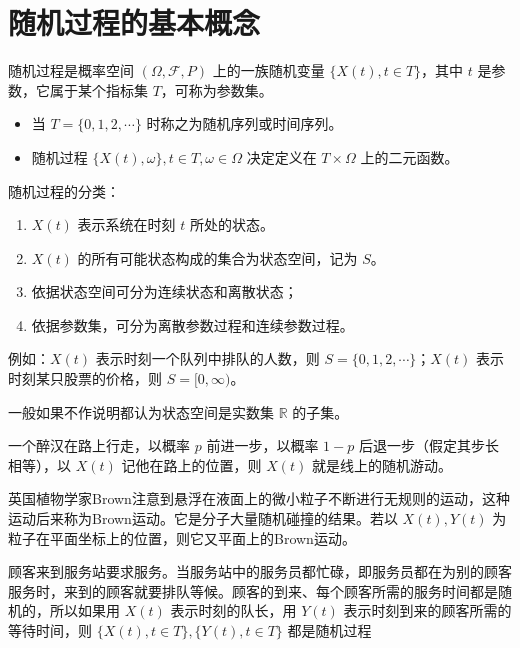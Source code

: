 \documentclass[lang=cn,10pt,thmcnt=section]{elegantbook}
\begin{document}
\section{随机过程的基本概念}
\begin{definition}
	随机过程是概率空间 $(\Omega, \mathcal{F}, P)$ 上的一族随机变量 $\{X(t), t \in T\}$，其中 $t$ 是参数，它属于某个指标集 $T$，可称为参数集。
\end{definition}
\begin{remark}
	\begin{itemize}
		\item 当 $T = \{0, 1, 2, \cdots\}$ 时称之为随机序列或时间序列。
		\item 随机过程 $\{X(t), \omega\}, t \in T, \omega \in \Omega$ 决定定义在 $T \times \Omega$ 上的二元函数。
	\end{itemize}
	
\end{remark}
随机过程的分类：
	\begin{enumerate}
		\item $X(t)$ 表示系统在时刻 $t$ 所处的状态。
		\item $X(t)$ 的所有可能状态构成的集合为状态空间，记为 $S$。
		\item 依据状态空间可分为连续状态和离散状态；
		\item 依据参数集，可分为离散参数过程和连续参数过程。
	\end{enumerate}
	例如：$X(t)$ 表示时刻一个队列中排队的人数，则 $S = \{0, 1, 2, \cdots\}$；$X(t)$ 表示时刻某只股票的价格，则 $S = [0, \infty)$。
	
\begin{remark}
	一般如果不作说明都认为状态空间是实数集 $\mathbb{R}$ 的子集。

\end{remark}
\begin{example}[随机游动]
	一个醉汉在路上行走，以概率 $p$ 前进一步，以概率 $1-p$ 后退一步（假定其步长相等），以 $X(t)$ 记他在路上的位置，则 $X(t)$ 就是线上的随机游动。

\end{example}
\begin{example}[Brown运动]
	英国植物学家Brown注意到悬浮在液面上的微小粒子不断进行无规则的运动，这种运动后来称为Brown运动。它是分子大量随机碰撞的结果。若以 $X(t), Y(t)$ 为粒子在平面坐标上的位置，则它又平面上的Brown运动。
\end{example}
\begin{example}[排队模型]
	顾客来到服务站要求服务。当服务站中的服务员都忙碌，即服务员都在为别的顾客服务时，来到的顾客就要排队等候。顾客的到来、每个顾客所需的服务时间都是随机的，所以如果用 $X(t)$ 表示时刻的队长，用 $Y(t)$ 表示时刻到来的顾客所需的等待时间，则 $\{X(t), t \in T\}, \{Y(t), t \in T\}$ 都是随机过程
\end{example}
\end{document}

